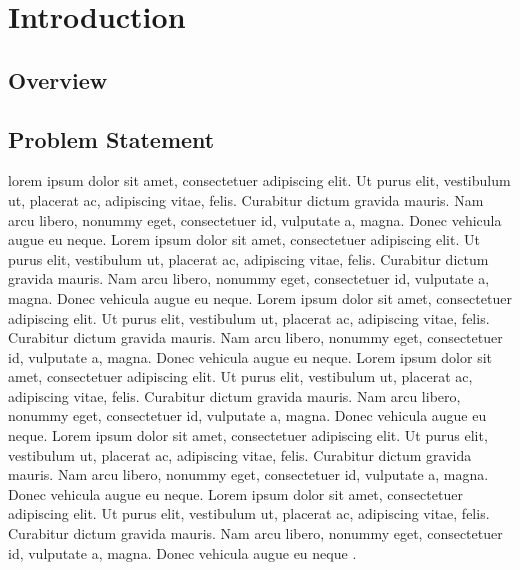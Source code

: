 
\chapter{Introduction}\doublespacing %

\label{Chapter1} %



\section{Overview}
\lipsum[1-3]


\section{Problem Statement}
\cite{IRC:103-2012} lorem ipsum dolor sit amet, consectetuer adipiscing elit. Ut purus elit, vestibulum ut, placerat ac, adipiscing vitae, felis. Curabitur dictum gravida mauris. Nam arcu libero, nonummy eget, consectetuer id, vulputate a, magna. Donec vehicula augue eu neque. Lorem ipsum dolor sit amet, consectetuer adipiscing elit. Ut purus elit, vestibulum ut, placerat ac, adipiscing vitae, felis. Curabitur dictum gravida mauris. Nam arcu libero, nonummy eget, consectetuer id, vulputate a, magna. Donec vehicula augue eu neque. Lorem ipsum dolor sit amet, consectetuer adipiscing elit. Ut purus elit, vestibulum ut, placerat ac, adipiscing vitae, felis. Curabitur dictum gravida mauris. Nam arcu libero, nonummy eget, consectetuer id, vulputate a, magna. Donec vehicula augue eu neque. Lorem ipsum dolor sit amet, consectetuer adipiscing elit. Ut purus elit, vestibulum ut, placerat ac, adipiscing vitae, felis. Curabitur dictum gravida mauris. Nam arcu libero, nonummy eget, consectetuer id, vulputate a, magna. Donec vehicula augue eu neque. Lorem ipsum dolor sit amet, consectetuer adipiscing elit. Ut purus elit, vestibulum ut, placerat ac, adipiscing vitae, felis. Curabitur dictum gravida mauris. Nam arcu libero, nonummy eget, consectetuer id, vulputate a, magna. Donec vehicula augue eu neque. Lorem ipsum dolor sit amet, consectetuer adipiscing elit. Ut purus elit, vestibulum ut, placerat ac, adipiscing vitae, felis. Curabitur dictum gravida mauris. Nam arcu libero, nonummy eget, consectetuer id, vulputate a, magna. Donec vehicula augue eu neque \citep{WHO-2018}.



